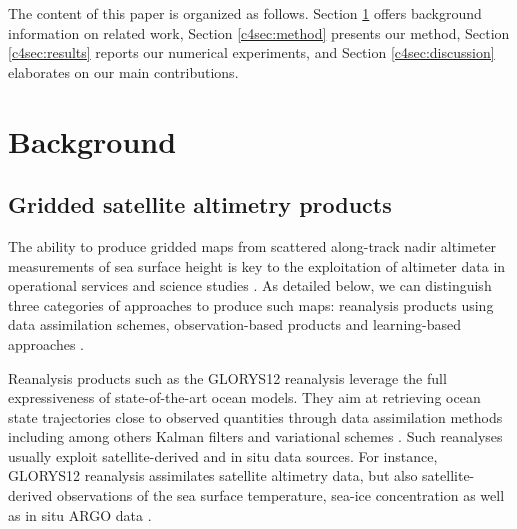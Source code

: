 \begin{bibunit}[IEEEtran.bst]


    
The content of this paper is organized as follows. Section \ref{c4sec:background} offers background information on related work, Section \ref{c4sec:method} presents our method, Section \ref{c4sec:results} reports our numerical experiments, and Section \ref{c4sec:discussion} elaborates on our main contributions.




\section{Background}
\label{c4sec:background}
\subsection{Gridded satellite altimetry products}
\label{c4ssec:interpolation}
The ability to produce gridded maps from scattered along-track nadir altimeter measurements of sea surface height is key to the exploitation of altimeter data in operational services and science studies \cite{abdallaAltimetryFutureBuilding2021}.
As detailed below, we can distinguish three categories of approaches to produce such maps: reanalysis products \cite{jean-michelCopernicusGlobal122021} using data assimilation schemes, observation-based products \cite{taburetDUACSDT2018252019} and learning-based approaches \cite{fabletENDTOENDPHYSICSINFORMEDREPRESENTATION2021}.

Reanalysis products such as the GLORYS12 reanalysis \cite{jean-michelCopernicusGlobal122021} leverage the full expressiveness of state-of-the-art ocean models. They aim at retrieving ocean state trajectories close to observed quantities through data assimilation methods including among others Kalman filters and variational schemes \cite{carrassiDataAssimilationGeosciences2018}. Such reanalyses usually exploit satellite-derived and in situ data sources. For instance, GLORYS12 reanalysis assimilates satellite altimetry data, but also satellite-derived observations of the sea surface temperature, sea-ice concentration as well as in situ ARGO data  \cite{wongArgoData19992020}.



\end{bibunit}
